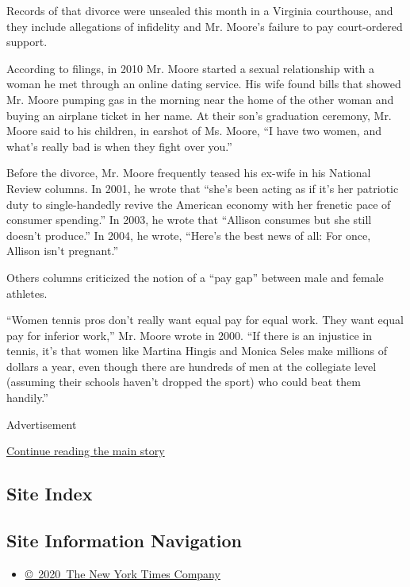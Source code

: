 Records of that divorce were unsealed this month in a Virginia
courthouse, and they include allegations of infidelity and Mr. Moore's
failure to pay court-ordered support.

According to filings, in 2010 Mr. Moore started a sexual relationship
with a woman he met through an online dating service. His wife found
bills that showed Mr. Moore pumping gas in the morning near the home of
the other woman and buying an airplane ticket in her name. At their
son's graduation ceremony, Mr. Moore said to his children, in earshot of
Ms. Moore, ``I have two women, and what's really bad is when they fight
over you.''

Before the divorce, Mr. Moore frequently teased his ex-wife in his
National Review columns. In 2001, he wrote that ``she's been acting as
if it's her patriotic duty to single-handedly revive the American
economy with her frenetic pace of consumer spending.'' In 2003, he wrote
that ``Allison consumes but she still doesn't produce.'' In 2004, he
wrote, ``Here's the best news of all: For once, Allison isn't
pregnant.''

Others columns criticized the notion of a ``pay gap'' between male and
female athletes.

``Women tennis pros don't really want equal pay for equal work. They
want equal pay for inferior work,'' Mr. Moore wrote in 2000. ``If there
is an injustice in tennis, it's that women like Martina Hingis and
Monica Seles make millions of dollars a year, even though there are
hundreds of men at the collegiate level (assuming their schools haven't
dropped the sport) who could beat them handily.''

Advertisement

\protect\hyperlink{after-bottom}{Continue reading the main story}

\hypertarget{site-index}{%
\subsection{Site Index}\label{site-index}}

\hypertarget{site-information-navigation}{%
\subsection{Site Information
Navigation}\label{site-information-navigation}}

\begin{itemize}
\tightlist
\item
  \href{https://help.nytimes.com/hc/en-us/articles/115014792127-Copyright-notice}{©~2020~The
  New York Times Company}
\end{itemize}


